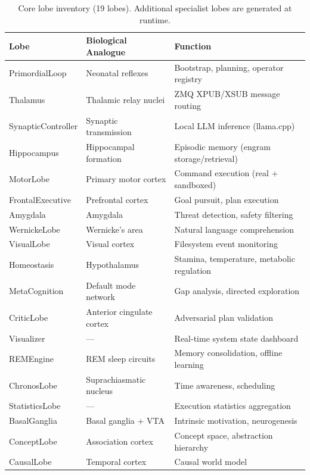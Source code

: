 \documentclass[12pt,a4paper]{report}
\begin{document}
\begin{table}[H]
\centering
\small
\begin{tabular}{lll}
\toprule
\textbf{Lobe} & \textbf{Biological Analogue} & \textbf{Function} \\
\midrule
PrimordialLoop & Neonatal reflexes & Bootstrap, planning, operator registry \\
Thalamus & Thalamic relay nuclei & ZMQ XPUB/XSUB message routing \\
SynapticController & Synaptic transmission & Local LLM inference (llama.cpp) \\
Hippocampus & Hippocampal formation & Episodic memory (engram storage/retrieval) \\
MotorLobe & Primary motor cortex & Command execution (real + sandboxed) \\
FrontalExecutive & Prefrontal cortex & Goal pursuit, plan execution \\
Amygdala & Amygdala & Threat detection, safety filtering \\
WernickeLobe & Wernicke's area & Natural language comprehension \\
VisualLobe & Visual cortex & Filesystem event monitoring \\
Homeostasis & Hypothalamus & Stamina, temperature, metabolic regulation \\
MetaCognition & Default mode network & Gap analysis, directed exploration \\
CriticLobe & Anterior cingulate cortex & Adversarial plan validation \\
Visualizer & --- & Real-time system state dashboard \\
REMEngine & REM sleep circuits & Memory consolidation, offline learning \\
ChronosLobe & Suprachiasmatic nucleus & Time awareness, scheduling \\
StatisticsLobe & --- & Execution statistics aggregation \\
BasalGanglia & Basal ganglia + VTA & Intrinsic motivation, neurogenesis \\
ConceptLobe & Association cortex & Concept space, abstraction hierarchy \\
CausalLobe & Temporal cortex & Causal world model \\
\bottomrule
\end{tabular}
\caption{Core lobe inventory (19 lobes). Additional specialist lobes are generated at runtime.}
\end{table}
\end{document}
